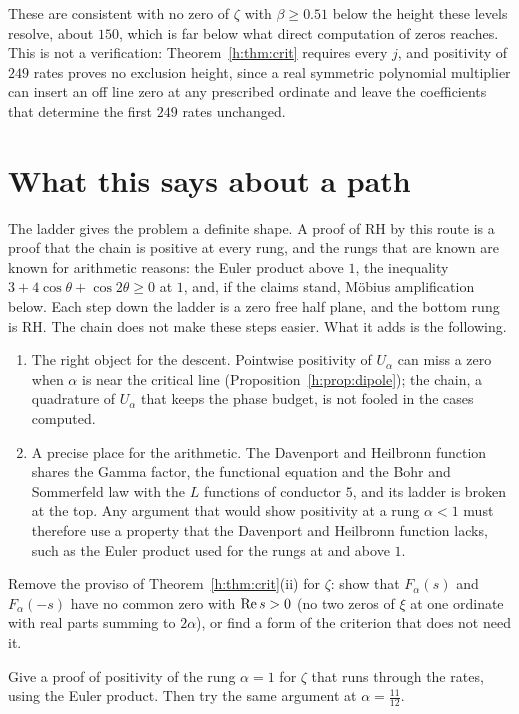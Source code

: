 These are consistent with no zero of $\zeta$ with $\beta\ge0.51$ below the height these levels resolve, about $150$, which is far below what direct computation of zeros reaches. This is not a verification: Theorem~\ref{h:thm:crit} requires every $j$, and positivity of $249$ rates proves no exclusion height, since a real symmetric polynomial multiplier can insert an off line zero at any prescribed ordinate and leave the coefficients that determine the first $249$ rates unchanged.
\section{What this says about a path}

The ladder gives the problem a definite shape. A proof of RH by this route is a proof that the chain is positive at every rung, and the rungs that are known are known for arithmetic reasons: the Euler product above $1$, the inequality $3+4\cos\theta+\cos2\theta\ge0$ at $1$, and, if the claims stand, M\"obius amplification below. Each step down the ladder is a zero free half plane, and the bottom rung is RH. The chain does not make these steps easier. What it adds is the following.
\begin{enumerate}
\item The right object for the descent. Pointwise positivity of $U_\alpha$ can miss a zero when $\alpha$ is near the critical line (Proposition~\ref{h:prop:dipole}); the chain, a quadrature of $U_\alpha$ that keeps the phase budget, is not fooled in the cases computed.
\item A precise place for the arithmetic. The Davenport and Heilbronn function shares the Gamma factor, the functional equation and the Bohr and Sommerfeld law with the $L$ functions of conductor $5$, and its ladder is broken at the top. Any argument that would show positivity at a rung $\alpha<1$ must therefore use a property that the Davenport and Heilbronn function lacks, such as the Euler product used for the rungs at and above $1$.
\end{enumerate}
\begin{problem}
Remove the proviso of Theorem~\ref{h:thm:crit}(ii) for $\zeta$: show that $F_\alpha(s)$ and $F_\alpha(-s)$ have no common zero with $\operatorname{Re} s>0$ (no two zeros of $\xi$ at one ordinate with real parts summing to $2\alpha$), or find a form of the criterion that does not need it.
\end{problem}

\begin{problem}
Give a proof of positivity of the rung $\alpha=1$ for $\zeta$ that runs through the rates, using the Euler product. Then try the same argument at $\alpha=\frac{11}{12}$.
\end{problem}

